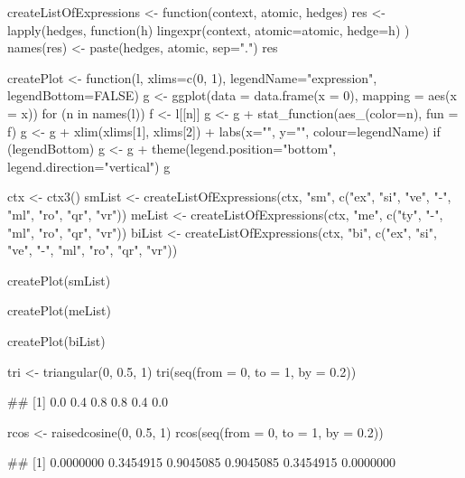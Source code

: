 \documentclass{article}\usepackage[]{graphicx}\usepackage[]{color}
\begin{document}
\begin{Schunk}
\begin{Sinput}
createListOfExpressions <- function(context, atomic, hedges) {
  res <- lapply(hedges, function(h) {
    lingexpr(context, atomic=atomic, hedge=h)
  })
  names(res) <- paste(hedges, atomic, sep=".")
  res
}

createPlot <- function(l, xlims=c(0, 1), legendName="expression", legendBottom=FALSE) {
  g <- ggplot(data = data.frame(x = 0), mapping = aes(x = x))
  for (n in names(l)) {
    f <- l[[n]]
    g <- g + stat_function(aes_(color=n), fun = f)
  }
  g <- g +
    xlim(xlims[1], xlims[2]) +
    labs(x="", y="", colour=legendName)
  if (legendBottom) {
    g <- g + theme(legend.position="bottom", legend.direction="vertical")
  }
  g
}

ctx <- ctx3()
smList <- createListOfExpressions(ctx,  "sm",
                                  c("ex", "si", "ve", "-", "ml", "ro", "qr", "vr"))
meList <- createListOfExpressions(ctx,  "me",
                                  c("ty", "-", "ml", "ro", "qr", "vr"))
biList <- createListOfExpressions(ctx,  "bi",
                                  c("ex", "si", "ve", "-", "ml", "ro", "qr", "vr"))

createPlot(smList)
\end{Sinput}
\end{Schunk}

\begin{Schunk}
\begin{Sinput}
createPlot(meList)
\end{Sinput}
\end{Schunk}

\begin{Schunk}
\begin{Sinput}
createPlot(biList)
\end{Sinput}
\end{Schunk}

\begin{Schunk}
% --begin: "triangular"
\begin{Sinput}
tri <- triangular(0, 0.5, 1)
tri(seq(from = 0, to = 1, by = 0.2))
\end{Sinput}
\begin{Soutput}
## [1] 0.0 0.4 0.8 0.8 0.4 0.0
\end{Soutput}
\begin{Sinput}
rcos <- raisedcosine(0, 0.5, 1)
rcos(seq(from = 0, to = 1, by = 0.2))
\end{Sinput}
\begin{Soutput}
## [1] 0.0000000 0.3454915 0.9045085 0.9045085 0.3454915 0.0000000
\end{Soutput}
%
% --end: "triangular"
\end{Schunk}
\end{document}

